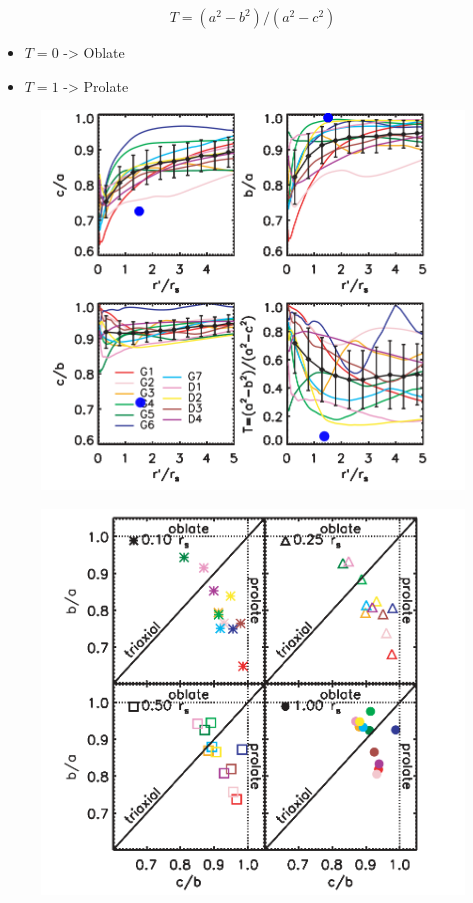 \documentclass[16pt]{article}
\begin{document}
\begin{equation}
T = (a^2 - b^2)/(a^2-c^2)
\end{equation}

\begin{itemize}
\item $T=0$ -> Oblate
\item $T=1$ -> Prolate 
\end{itemize}


\begin{figure}[H]
\centering
\includegraphics[scale=0.5]{hayashimod.png}
\end{figure}

\begin{figure}[H]
\centering
\includegraphics[scale=0.5]{prolateoblatehayashi.png}
\end{figure}
\end{document}
